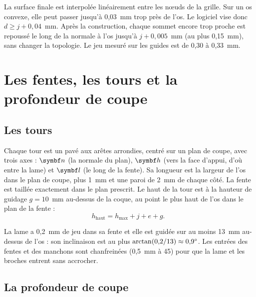 \begin{attention}[title={Un jeu exact, au centième de millimètre}]
La surface finale est interpolée linéairement entre les nœuds de la grille. Sur un os convexe, elle peut passer
jusqu'à 0,03~mm trop près de l'os. Le logiciel vise donc $d \geq j + 0{,}04$~mm. Après la construction, chaque sommet
encore trop proche est repoussé le long de la normale à l'os jusqu'à $j + 0{,}005$~mm (au plus 0,15~mm), sans changer
la topologie. Le jeu mesuré sur les guides est de 0,30 à 0,33~mm.
\end{attention}

\section{Les fentes, les tours et la profondeur de coupe}
\label{sec:butee}

\subsection{Les tours}

Chaque tour est un pavé aux arêtes arrondies, centré sur un plan de coupe, avec trois axes : $\vb{n}$ (la normale du
plan), $\vb{h}$ (vers la face d'appui, d'où entre la lame) et $\vb{l}$ (le long de la fente). Sa longueur est la largeur
de l'os dans le plan de coupe, plus 1~mm et une paroi de 2~mm de chaque côté. La fente est taillée exactement dans le
plan prescrit. Le haut de la tour est à la hauteur de guidage $g = 10$~mm au-dessus de la coque, au point le plus haut
de l'os dans le plan de la fente :
\begin{equation}
  h_{\text{haut}} = h_{\max} + j + e + g.
\end{equation}

\begin{exemple}
La lame a 0,2~mm de jeu dans sa fente et elle est guidée sur au moins 13~mm au-dessus de l'os : son inclinaison est
au plus $\arctan(0{,}2/13) \approx 0{,}9^\circ$. Les entrées des fentes et des manchons sont chanfreinées (0,5~mm à
45\degre) pour que la lame et les broches entrent sans accrocher.
\end{exemple}

\subsection{La profondeur de coupe}

